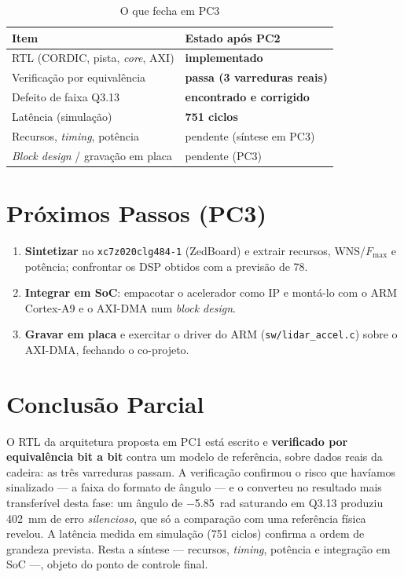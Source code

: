 \documentclass[conference]{IEEEtran}
\begin{document}
\begin{table}[!t]
\caption{O que fecha em PC3}
\label{tab:pc3}
\centering\footnotesize
\begin{tabular}{@{}ll@{}}
\toprule
\textbf{Item} & \textbf{Estado ap\'os PC2} \\
\midrule
RTL (CORDIC, pista, \emph{core}, AXI) & \textbf{implementado} \\
Verifica\c{c}\~ao por equival\^encia    & \textbf{passa (3 varreduras reais)} \\
Defeito de faixa Q3.13                 & \textbf{encontrado e corrigido} \\
Lat\^encia (simula\c{c}\~ao)           & \textbf{\num{751} ciclos} \\
Recursos, \emph{timing}, pot\^encia    & pendente (s\'intese em PC3) \\
\emph{Block design} / grava\c{c}\~ao em placa & pendente (PC3) \\
\bottomrule
\end{tabular}
\end{table}

\section{Pr\'oximos Passos (PC3)}
\begin{enumerate}
\item \textbf{Sintetizar} no \texttt{xc7z020clg484-1} (ZedBoard) e extrair
recursos, WNS/$F_{\max}$ e pot\^encia; confrontar os DSP obtidos com a previs\~ao
de \num{78}.
\item \textbf{Integrar em SoC}: empacotar o acelerador como IP e mont\'a-lo com o
ARM Cortex-A9 e o AXI-DMA num \emph{block design}.
\item \textbf{Gravar em placa} e exercitar o driver do ARM
(\texttt{sw/lidar\_accel.c}) sobre o AXI-DMA, fechando o co-projeto.
\end{enumerate}

\section{Conclus\~ao Parcial}

O RTL da arquitetura proposta em PC1 est\'a escrito e \textbf{verificado por
equival\^encia bit a bit} contra um modelo de refer\^encia, sobre dados reais da
cadeira: as tr\^es varreduras passam. A verifica\c{c}\~ao confirmou o risco que
hav\'iamos sinalizado --- a faixa do formato de \^angulo --- e o converteu no
resultado mais transfer\'ivel desta fase: um \^angulo de \SI{-5.85}{\radian}
saturando em Q3.13 produziu \SI{402}{\milli\metre} de erro \emph{silencioso}, que
s\'o a compara\c{c}\~ao com uma refer\^encia f\'isica revelou. A lat\^encia
medida em simula\c{c}\~ao (\num{751} ciclos) confirma a ordem de grandeza
prevista. Resta a s\'intese --- recursos, \emph{timing}, pot\^encia e
integra\c{c}\~ao em SoC ---, objeto do ponto de controle final.
\end{document}
